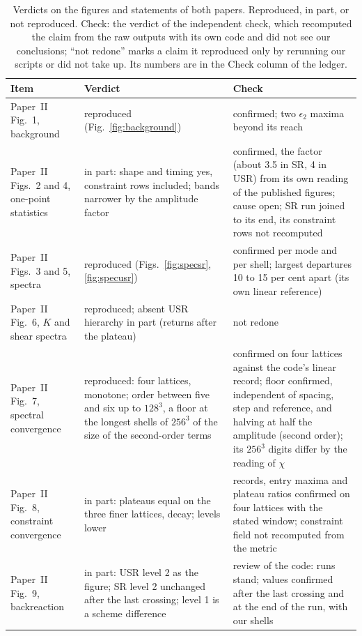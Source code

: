 \documentclass[aps,prd,twocolumn,10pt,superscriptaddress,nofootinbib,longbibliography,floatfix]{revtex4-2}
\newcommand{\Ptwo}{Paper~II}
\begin{document}
\begin{table}
\caption{Verdicts on the figures and statements of both papers. Reproduced, in part, or not reproduced. Check: the verdict of the independent check, which recomputed the claim from the raw outputs with its own code and did not see our conclusions; ``not redone'' marks a claim it reproduced only by rerunning our scripts or did not take up. Its numbers are in the Check column of the ledger.}
\label{tab:verdicts}
\footnotesize
\begin{tabular}{p{}p{}p{}}
\toprule
Item & Verdict & Check \\
\midrule
\Ptwo{} Fig.~1, background & reproduced (Fig.~\ref{fig:background}) & confirmed; two $\epsilon_2$ maxima beyond its reach \\
\Ptwo{} Figs.~2 and 4, one-point statistics & in part: shape and timing yes, constraint rows included; bands narrower by the amplitude factor & confirmed, the factor (about 3.5 in SR, 4 in USR) from its own reading of the published figures; cause open; SR run joined to its end, its constraint rows not recomputed \\
\Ptwo{} Figs.~3 and 5, spectra & reproduced (Figs.~\ref{fig:specsr}, \ref{fig:specusr}) & confirmed per mode and per shell; largest departures 10 to 15 per cent apart (its own linear reference) \\
\Ptwo{} Fig.~6, $K$ and shear spectra & reproduced; absent USR hierarchy in part (returns after the plateau) & not redone \\
\Ptwo{} Fig.~7, spectral convergence & reproduced: four lattices, monotone; order between five and six up to $128^3$, a floor at the longest shells of $256^3$ of the size of the second-order terms & confirmed on four lattices against the code's linear record; floor confirmed, independent of spacing, step and reference, and halving at half the amplitude (second order); its $256^3$ digits differ by the reading of $\chi$ \\
\Ptwo{} Fig.~8, constraint convergence & in part: plateaus equal on the three finer lattices, decay; levels lower & records, entry maxima and plateau ratios confirmed on four lattices with the stated window; constraint field not recomputed from the metric \\
\Ptwo{} Fig.~9, backreaction & in part: USR level 2 as the figure; SR level 2 unchanged after the last crossing; level 1 is a scheme difference & review of the code: runs stand; values confirmed after the last crossing and at the end of the run, with our shells \\

\end{tabular}
\end{table}
\end{document}
